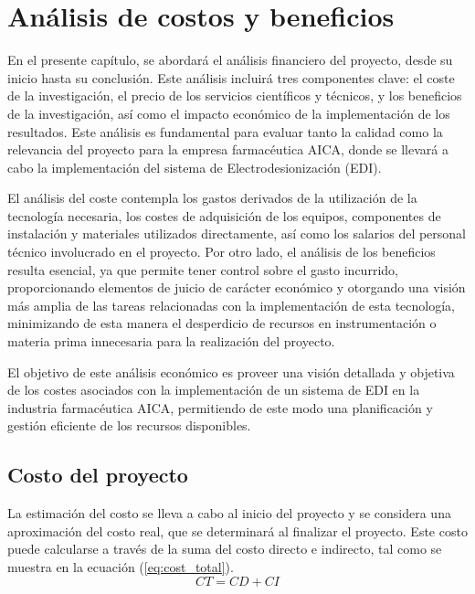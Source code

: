 \chapter{Análisis de costos y beneficios}
En el presente capítulo, se abordará el análisis financiero del proyecto, desde su inicio hasta su conclusión.
Este análisis incluirá tres componentes clave: el coste de la investigación, el precio de los servicios
científicos y técnicos, y los beneficios de la investigación, así como el impacto económico de la
implementación de los resultados. Este análisis es fundamental para evaluar tanto la calidad como la
relevancia del proyecto para la empresa farmacéutica AICA, donde se llevará a cabo la implementación
del sistema de Electrodesionización (EDI).

El análisis del coste contempla los gastos derivados de la utilización de la tecnología necesaria,
los costes de adquisición de los equipos, componentes de instalación y materiales utilizados directamente,
así como los salarios del personal técnico involucrado en el proyecto. Por otro lado, el análisis de los
beneficios resulta esencial, ya que permite tener control sobre el gasto incurrido, proporcionando elementos
de juicio de carácter económico y otorgando una visión más amplia de las tareas relacionadas con la
implementación de esta tecnología, minimizando de esta manera el desperdicio de recursos en instrumentación
o materia prima innecesaria para la realización del proyecto.

El objetivo de este análisis económico es proveer una visión detallada y objetiva de los costes asociados con
la implementación de un sistema de EDI en la industria farmacéutica AICA, permitiendo de este modo una
planificación y gestión eficiente de los recursos disponibles.


\section{Costo del proyecto}

La estimación del costo se lleva a cabo al inicio del proyecto y se considera una aproximación del costo
real, que se determinará al finalizar el proyecto. Este costo puede calcularse a través de la suma del
costo directo e indirecto, tal como se muestra en la ecuación (\ref{eq:cost_total}). \\

\begin{equation}
    \label{eq:cost_total}
    CT = CD + CI
\end{equation}

